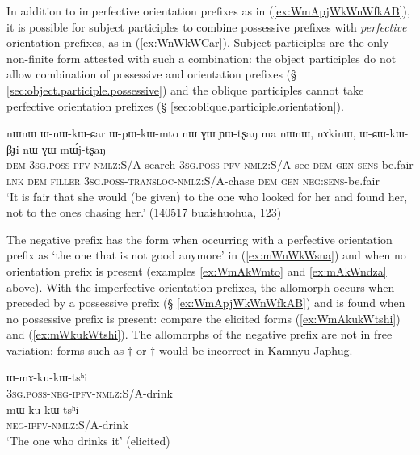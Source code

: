 In addition to imperfective orientation prefixes as in (\ref{ex:WmApjWkWnWfkAB}), it is possible for subject participles to combine possessive prefixes with \textit{perfective} orientation prefixes, as in (\ref{ex:WnWkWCar}). Subject participles are the only non-finite form attested with such a combination: the object participles do not allow combination of possessive and orientation prefixes (§ \ref{sec:object.participle.possessive}) and the oblique participles cannot take perfective orientation prefixes (§ \ref{sec:oblique.participle.orientation}).

 \begin{exe} 
\ex \label{ex:WnWkWCar}
\gll nɯnɯ ɯ-nɯ-kɯ-ɕar ɯ-pɯ-kɯ-mto nɯ ɣɯ ɲɯ-tʂaŋ ma nɯnɯ, nɤkinɯ, ɯ-ɕɯ-kɯ-βɟi nɯ ɣɯ mɯ́j-tʂaŋ \\
\textsc{dem} \textsc{3sg}.\textsc{poss}-\textsc{pfv}-\textsc{nmlz}:S/A-search \textsc{3sg}.\textsc{poss}-\textsc{pfv}-\textsc{nmlz}:S/A-see \textsc{dem} \textsc{gen} \textsc{sens}-be.fair \textsc{lnk} \textsc{dem} \textsc{filler} \textsc{3sg}.\textsc{poss}-\textsc{transloc}-\textsc{nmlz}:S/A-chase \textsc{dem} \textsc{gen} \textsc{neg}:\textsc{sens}-be.fair \\
\glt `It is fair that she would (be given) to the one who looked for her and found her, not to the ones chasing her.' (140517 buaishuohua, 123)
\end{exe}

The negative prefix has the form  when occurring with a perfective orientation prefix as  `the one that is not good anymore' in (\ref{ex:mWnWkWsna}) and  when no orientation prefix is present (examples \ref{ex:WmAkWmto} and \ref{ex:mAkWndza} above). With the imperfective orientation prefixes, the allomorph  occurs when preceded by a possessive prefix (§ \ref{ex:WmApjWkWnWfkAB}) and  is found when no possessive prefix is present: compare the elicited forms (\ref{ex:WmAkukWtshi}) and (\ref{ex:mWkukWtshi}). The allomorphs of the negative prefix are not in free variation: forms such as $\dagger$ or $\dagger$ would be incorrect in Kamnyu Japhug.

 \begin{exe} 
\ex \label{ex:WmAkukWtshi}
\gll ɯ-mɤ-ku-kɯ-tsʰi \\
\textsc{3sg}.\textsc{poss}-\textsc{neg}-\textsc{ipfv}-\textsc{nmlz}:S/A-drink \\
\ex \label{ex:mWkukWtshi}
\gll mɯ-ku-kɯ-tsʰi \\
\textsc{neg}-\textsc{ipfv}-\textsc{nmlz}:S/A-drink \\
\glt  `The one who drinks it' (elicited)
\end{exe}

